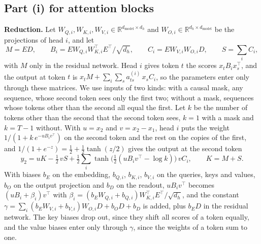 \documentclass[10pt]{article}
\theoremstyle{definition}
\theoremstyle{remark}
\newcommand{\R}{\mathbb{R}}
\newcommand{\dm}{d_{\mathrm{model}}}
\newcommand{\para}[1]{\smallskip\noindent\textbf{#1}\hspace{0.5em}}
\begin{document}
\subsection*{Part (i) for attention blocks}

\para{Reduction.} Let $W_{Q,i}, W_{K,i}, W_{V,i} \in \R^{\dm\times d_h}$ and $W_{O,i} \in \R^{d_h\times\dm}$ be the projections of head $i$, and let
\[
M = ED, \qquad B_i = EW_{Q,i}W_{K,i}^\top E^\top/\sqrt{d_h}, \qquad C_i = EW_{V,i}W_{O,i}D, \qquad S = \textstyle\sum_i C_i,
\]
with $M$ only in the residual network. Head $i$ gives token $t$ the scores $x_tB_ix_s^\top$, and the output at token $t$ is $x_tM + \sum_i\sum_s a^{(i)}_{ts}\,x_sC_i$, so the parameters enter only through these matrices. We use inputs of two kinds: with a causal mask, any sequence, whose second token sees only the first two; without a mask, sequences whose tokens other than the second all equal the first. Let $k$ be the number of tokens other than the second that the second token sees, $k = 1$ with a mask and $k = T - 1$ without. With $u = x_2$ and $v = x_2 - x_1$, head $i$ puts the weight $1/(1 + k\,e^{-uB_iv^\top})$ on the second token and the rest on the copies of the first, and $1/(1 + e^{-z}) = \tfrac12 + \tfrac12\tanh(z/2)$ gives the output at the second token
\begin{equation}\label{eq:twotok}
y_2 = uK - \tfrac12\,vS + \tfrac12\sum_i \tanh\big(\tfrac12(uB_iv^\top - \log k)\big)\,vC_i, \qquad K = M + S.
\end{equation}
With biases $b_E$ on the embedding, $b_{Q,i}$, $b_{K,i}$, $b_{V,i}$ on the queries, keys and values, $b_O$ on the output projection and $b_D$ on the readout, $uB_iv^\top$ becomes $(uB_i + \beta_i)v^\top$ with $\beta_i = (b_EW_{Q,i} + b_{Q,i})W_{K,i}^\top E^\top/\sqrt{d_h}$, and the constant $\gamma = \sum_i(b_EW_{V,i} + b_{V,i})W_{O,i}D + b_OD + b_D$ is added, plus $b_ED$ in the residual network. The key biases drop out, since they shift all scores of a token equally, and the value biases enter only through $\gamma$, since the weights of a token sum to one.
\end{document}
